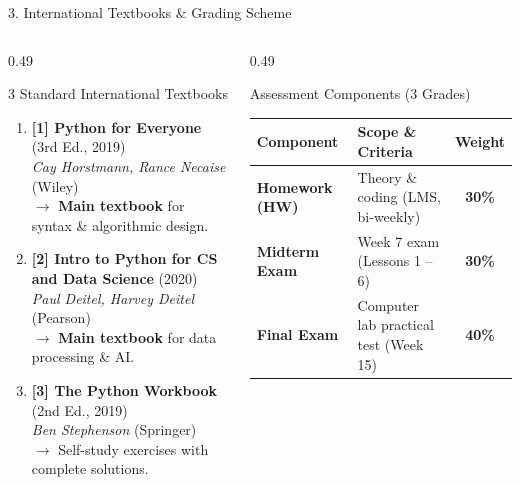 \documentclass[aspectratio=169, 10pt]{beamer}
\begin{document}
\begin{frame}{3. International Textbooks \& Grading Scheme}
  \begin{columns}[T]
    \begin{column}{0.49\textwidth}
      \begin{cbox}[primaryblue]{3 Standard International Textbooks}
        \footnotesize
        \begin{enumerate}\setlength{\itemsep}{3pt}
          \item \textbf{[1] Python for Everyone} (3rd Ed., 2019)\\
          \textit{Cay Horstmann, Rance Necaise} (Wiley)\\
          $\rightarrow$ \textbf{Main textbook} for syntax \& algorithmic design.
          \item \textbf{[2] Intro to Python for CS and Data Science} (2020)\\
          \textit{Paul Deitel, Harvey Deitel} (Pearson)\\
          $\rightarrow$ \textbf{Main textbook} for data processing \& AI.
          \item \textbf{[3] The Python Workbook} (2nd Ed., 2019)\\
          \textit{Ben Stephenson} (Springer)\\
          $\rightarrow$ Self-study exercises with complete solutions.
        \end{enumerate}
      \end{cbox}
    \end{column}
    \begin{column}{0.49\textwidth}
      \begin{cbox}[secondarygreen]{Assessment Components (3 Grades)}
        \scriptsize
        \begin{tabularx}{\textwidth}{lX c}
          \toprule
          \textbf{Component} & \textbf{Scope \& Criteria} & \textbf{Weight} \\
          \midrule
          \textbf{Homework (HW)} & Theory \& coding (LMS, bi-weekly) & \textbf{30\%} \\
          \textbf{Midterm Exam} & Week 7 exam (Lessons 1 -- 6) & \textbf{30\%} \\
          \textbf{Final Exam} & Computer lab practical test (Week 15) & \textbf{40\%} \\
          \bottomrule
        \end{tabularx}
      \end{cbox}
      \vspace{0.1cm}

\end{column}
\end{columns}
\end{frame}
\end{document}
